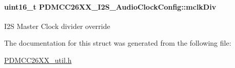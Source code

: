 \paragraph[{mclk\+Div}]{\setlength{\rightskip}{0pt plus 5cm}uint16\+\_\+t P\+D\+M\+C\+C26\+X\+X\+\_\+\+I2\+S\+\_\+\+Audio\+Clock\+Config\+::mclk\+Div}\label{struct_p_d_m_c_c26_x_x___i2_s___audio_clock_config_a4c695f4c6e3933bacc7c1abab4eb379a}
I2\+S Master Clock divider override 

The documentation for this struct was generated from the following file\+:\begin{DoxyCompactItemize}
\item 
\hyperlink{_p_d_m_c_c26_x_x__util_8h}{P\+D\+M\+C\+C26\+X\+X\+\_\+util.\+h}\end{DoxyCompactItemize}
